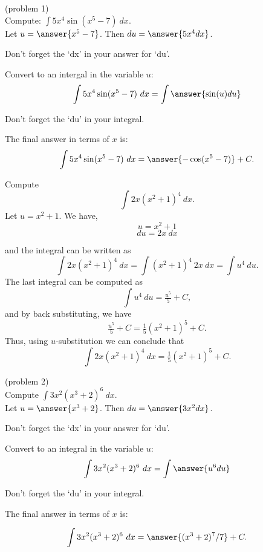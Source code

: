 \documentclass[handout]{ximera}
\begin{document}
\begin{problem}(problem 1)\\ Compute: $\displaystyle{\int 5x^4\sin(x^5 -7) \ dx}$.\\
Let $u = \answer{x^5 - 7}$. Then $du = \answer{5x^4 dx}$.\\
\begin{hint}
Don't forget the `dx' in your answer for `du'.
\end{hint}
Convert to an intergal in the variable $u$:
\[\int 5x^4\sin(x^5 -7) \ dx = \int\answer{\sin(u) du}\]
\begin{hint}
Don't forget the `du' in your integral.
\end{hint}
The final answer in terms of $x$ is:
\[\int 5x^4\sin(x^5 -7) \ dx = \answer{-\cos(x^5 -7)} +C.\]
\end{problem}


\begin{example}[example 2] Compute 
\[\int 2x(x^2 + 1)^4 \ dx.\]
Let $u = x^2 + 1$.  We have,
\[u = x^2 + 1\]
\[du = 2x \ dx\]

and the integral can be written as 
\[\int 2x(x^2 + 1)^4 \ dx = \int (x^2 + 1)^4 \ 2x \  dx = \int u^4 \ du.\]
The last integral can be computed as 
\[\int u^4 \ du = \tfrac{u^5}{5} + C,\]
and by back substituting, we have 
\[\tfrac{u^5}{5} + C = \tfrac15(x^2 + 1)^5 + C .\]
Thus, using $u$-substitution we can conclude that
\[\int 2x(x^2 + 1)^4 \ dx  =  \tfrac15(x^2 + 1)^5 + C.\]
\end{example}

\begin{problem}(problem 2)\\
Compute $\displaystyle{\int 3x^2(x^3 + 2)^6 \ dx}$.\\
Let $u = \answer{x^3 + 2}$. Then $du = \answer{3x^2 dx}$.\\
\begin{hint}
Don't forget the `dx' in your answer for `du'.
\end{hint}
Convert to an integral in the variable $u$:
\[\int 3x^2(x^3 + 2)^6 \ dx = \int\answer{u^6 du}\]
\begin{hint}
Don't forget the `du' in your integral.
\end{hint}
The final answer in terms of $x$ is:

\[\int 3x^2(x^3 + 2)^6 \ dx = \answer{(x^3 + 2)^7/7} +C.\]
\end{problem}
\end{document}
